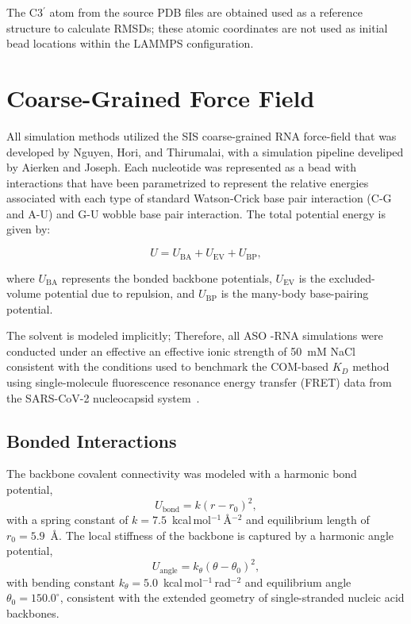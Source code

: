 The C3$^\prime$ atom from the source PDB files are obtained used as a reference structure to calculate RMSDs; these atomic coordinates are not used as initial bead locations within the LAMMPS configuration.


\section{Coarse-Grained Force Field}
\label{sec:forcefield}

All simulation methods utilized the SIS coarse-grained RNA force-field that was developed by Nguyen, Hori, and Thirumalai\cite{Aierken2024}, with a simulation pipeline develiped by Aierken and Joseph. Each nucleotide was represented as a bead with interactions that have been parametrized to represent the relative energies associated with each type of standard Watson-Crick base pair interaction (C-G and A-U) and G-U wobble base pair interaction. The total potential energy is given by:

\begin{equation}
  U = U_{\mathrm{BA}} + U_{\mathrm{EV}} + U_{\mathrm{BP}},
  \label{eq:Utot}
\end{equation}

where $U_{\mathrm{BA}}$ represents the bonded backbone potentials,
$U_{\mathrm{EV}}$ is the excluded-volume potential due to repulsion, and $U_{\mathrm{BP}}$
is the many-body base-pairing potential.


The solvent is modeled implicitly; Therefore, all ASO -RNA simulations were conducted under an effective an effective ionic strength of 50~mM NaCl consistent with the
conditions used to benchmark the COM-based $K_D$ method using single-molecule fluorescence resonance energy transfer (FRET) data from the SARS-CoV-2 nucleocapsid system~\cite{Alston2023}.






\subsection{Bonded Interactions}

The backbone covalent connectivity was modeled with a harmonic bond potential,
\begin{equation}
  U_{\mathrm{bond}} = k(r - r_0)^2,
\end{equation}
with a spring constant of $k = 7.5$~kcal\,mol$^{-1}$\,\AA$^{-2}$ and
equilibrium length of $r_0 = 5.9$~\AA.
The local stiffness of the backbone is captured by a harmonic angle potential,
\begin{equation}
  U_{\mathrm{angle}} = k_\theta(\theta - \theta_0)^2,
\end{equation}
with bending constant $k_\theta = 5.0$~kcal\,mol$^{-1}$\,rad$^{-2}$
and equilibrium angle $\theta_0 = 150.0^\circ$, consistent with the
extended geometry of single-stranded nucleic acid backbones.

